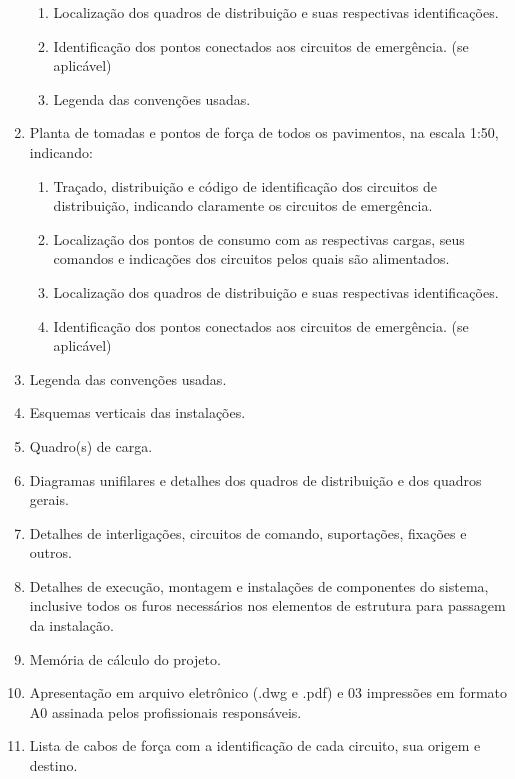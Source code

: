 \begin{enumerate}
\begin{enumerate}
				\item Localização dos quadros de distribuição e suas respectivas identificações.

				\item Identificação dos pontos conectados aos circuitos de emergência. (se aplicável)

				\item Legenda das convenções usadas.
			\end{enumerate}
		
		\item Planta de tomadas e pontos de força de todos os pavimentos, na escala 1:50, indicando:
		\begin{enumerate}

			\item Traçado, distribuição e código de identificação dos circuitos de distribuição, indicando claramente os circuitos de emergência.

			\item Localização dos pontos de consumo com as respectivas cargas, seus comandos e indicações dos circuitos pelos quais são alimentados.

			\item Localização dos quadros de distribuição e suas respectivas identificações.

			\item Identificação dos pontos conectados aos circuitos de emergência. (se aplicável)
		\end{enumerate}

		\item Legenda das convenções usadas.

		\item Esquemas verticais das instalações.

		\item Quadro(s) de carga.

		\item Diagramas unifilares e detalhes dos quadros de distribuição e dos quadros gerais.

		\item Detalhes de interligações, circuitos de comando, suportações, fixações e outros.

		\item Detalhes de execução, montagem e instalações de componentes do sistema, inclusive todos os furos necessários nos elementos de estrutura para passagem da instalação.

		\item Memória de cálculo do projeto.

		\item Apresentação em arquivo eletrônico (.dwg e .pdf) e 03 impressões em formato A0 assinada pelos profissionais responsáveis.

		\item Lista de cabos de força com a identificação de cada circuito, sua origem e destino.
	\end{enumerate}

